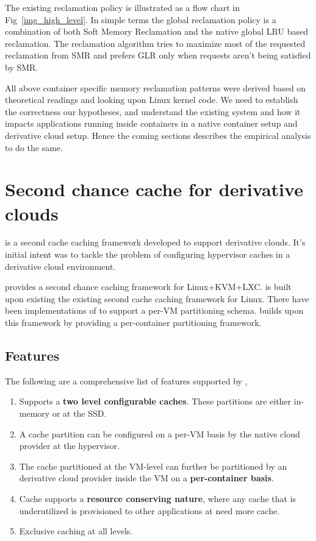       The existing reclamation policy is illustrated as a flow chart in Fig~\ref{img_high_level}. In simple terms the global reclamation 
policy is a combination of both Soft Memory Reclamation and the native global LRU based reclamation. The reclamation algorithm tries to 
maximize most of the requested reclamation from SMR and prefers GLR only when requests aren't being satisfied by SMR.

      All above container specific memory reclamation patterns were derived based on theoretical readings and looking upon Linux kernel 
code. We need to establish the correctness our hypotheses, and understand the existing system and how it impacts applications running 
inside containers in a native container setup and derivative cloud setup. Hence the coming sections describes the empirical analysis to 
do the same.
      
  
  \section{Second chance cache for derivative clouds}
  
    \dd{}\cite{doubledecker} is a second cache caching framework developed to support derivative clouds. It's initial intent was to tackle the
    problem of configuring hypervisor caches in a derivative cloud environment. 
    
    \dd{} provides a second chance caching framework for Linux+KVM+LXC.
    \dd{} is built upon existing the existing \tmem{} second cache caching framework for Linux. There have been implementations\cite{venkatesan2014ex} of \tmem{} 
    to support a per-VM partitioning schema. \dd{} builds upon this framework by providing a per-container partitioning framework.
    
    
    \subsection{Features}
    
    \noindent The following are a comprehensive list of features supported by \dd{},
      \begin{enumerate}
	\item Supports a \textbf{two level configurable caches}. These partitions are either in-memory or at the SSD. 
	\item A cache partition can be configured on a per-VM basis by the native cloud provider at the hypervisor.
	\item The cache partitioned at the VM-level can further be partitioned by an derivative cloud provider inside the VM on a \textbf{per-container basis}.
	\item Cache supports a \textbf{resource conserving nature}, where any cache that is underutilized is provisioned to other applications at need
	more cache.
	\item Exclusive caching at all levels.
      \end{enumerate}
      
